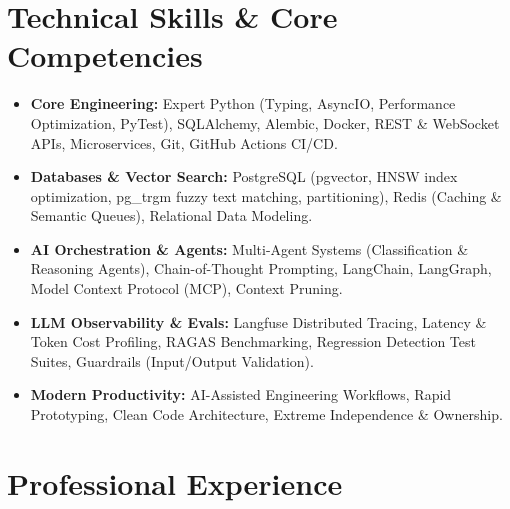 \documentclass[a4paper,10pt]{article}
\begin{document}
\section{Technical Skills \& Core Competencies}
\begin{itemize}[leftmargin=1.2em, itemsep=2pt]
  \item \textbf{Core Engineering:} Expert Python (Typing, AsyncIO, Performance Optimization, PyTest), SQLAlchemy, Alembic, Docker, REST \& WebSocket APIs, Microservices, Git, GitHub Actions CI/CD.
  \item \textbf{Databases \& Vector Search:} PostgreSQL (pgvector, HNSW index optimization, pg\_trgm fuzzy text matching, partitioning), Redis (Caching \& Semantic Queues), Relational Data Modeling.
  \item \textbf{AI Orchestration \& Agents:} Multi-Agent Systems (Classification \& Reasoning Agents), Chain-of-Thought Prompting, LangChain, LangGraph, Model Context Protocol (MCP), Context Pruning.
  \item \textbf{LLM Observability \& Evals:} Langfuse Distributed Tracing, Latency \& Token Cost Profiling, RAGAS Benchmarking, Regression Detection Test Suites, Guardrails (Input/Output Validation).
  \item \textbf{Modern Productivity:} AI-Assisted Engineering Workflows, Rapid Prototyping, Clean Code Architecture, Extreme Independence \& Ownership.
\end{itemize}

\section{Professional Experience}
\end{document}

